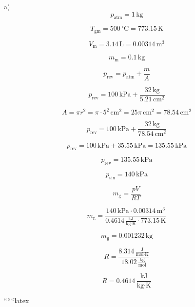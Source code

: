 a) \\
\[
p_{\text{atm}} = 1 \, \text{kg}
\]

\[
T_{\text{gm}} = 500 \, ^\circ \text{C} = 773.15 \, \text{K}
\]

\[
V_{\text{m}} = 3.14 \, \text{L} = 0.00314 \, \text{m}^3
\]

\[
m_{\text{m}} = 0.1 \, \text{kg}
\]

\[
p_{\text{rev}} = p_{\text{atm}} + \frac{m}{A}
\]

\[
p_{\text{rev}} = 100 \, \text{kPa} + \frac{32 \, \text{kg}}{5.21 \, \text{cm}^2}
\]

\[
A = \pi r^2 = \pi \cdot 5^2 \, \text{cm}^2 = 25 \pi \, \text{cm}^2 = 78.54 \, \text{cm}^2
\]

\[
p_{\text{rev}} = 100 \, \text{kPa} + \frac{32 \, \text{kg}}{78.54 \, \text{cm}^2}
\]

\[
p_{\text{rev}} = 100 \, \text{kPa} + 35.55 \, \text{kPa} = 135.55 \, \text{kPa}
\]

\[
p_{\text{rev}} = 135.55 \, \text{kPa}
\]

\[
p_{\text{sin}} = 140 \, \text{kPa}
\]

\[
m_{\text{g}} = \frac{pV}{RT}
\]

\[
m_{\text{g}} = \frac{140 \, \text{kPa} \cdot 0.00314 \, \text{m}^3}{0.4614 \, \frac{\text{kJ}}{\text{kg} \cdot \text{K}} \cdot 773.15 \, \text{K}}
\]

\[
m_{\text{g}} = 0.001232 \, \text{kg}
\]

\[
R = \frac{8.314 \, \frac{\text{J}}{\text{mol} \cdot \text{K}}}{18.02 \, \frac{\text{kg}}{\text{mol}}}
\]

\[
R = 0.4614 \, \frac{\text{kJ}}{\text{kg} \cdot \text{K}}
\]

``````latex